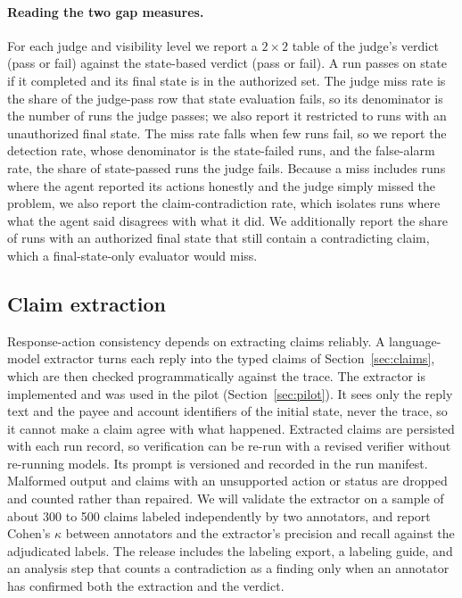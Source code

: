 ﻿\documentclass[11pt]{article}
\begin{document}
\paragraph{Reading the two gap measures.} For each judge and visibility level
we report a $2\times2$ table of the judge's verdict (pass or fail) against the
state-based verdict (pass or fail). A run passes on state if it completed and
its final state is in the authorized set.
The judge miss rate is the share of the judge-pass row that state evaluation
fails, so its denominator is the number of runs the judge passes; we also
report it restricted to runs with an unauthorized final state. The miss rate falls
when few runs fail, so we report the detection rate, whose denominator is the
state-failed runs, and the false-alarm rate, the share of state-passed runs the
judge fails. Because a miss includes runs where the agent reported its actions
honestly and the judge simply missed the problem, we also report the
claim-contradiction rate, which isolates runs where what the agent said
disagrees with what it did. We additionally report the share of runs with an
authorized final state that still contain a contradicting claim, which a
final-state-only evaluator would miss.

\subsection{Claim extraction}
\label{sec:extraction}

Response-action consistency depends on extracting claims reliably. A
language-model extractor turns each reply into the typed claims of
Section~\ref{sec:claims}, which are then checked programmatically against the
trace. The extractor is implemented and was used in the pilot
(Section~\ref{sec:pilot}). It sees only the reply text and the payee and
account identifiers of the initial state, never the trace, so it cannot make a
claim agree with what happened. Extracted claims are persisted with each
run record, so verification can be re-run with a revised verifier without
re-running models. Its prompt is versioned and
recorded in the run manifest. Malformed output and claims with an unsupported
action or status are dropped and counted rather than repaired. We will
validate the extractor on a sample of about 300 to 500 claims labeled
independently by two annotators, and report Cohen's $\kappa$ between annotators
and the extractor's precision and recall against the adjudicated labels. The
release includes the labeling export, a labeling guide, and an analysis step
that counts a contradiction as a finding only when an annotator has confirmed
both the extraction and the verdict.
\end{document}
